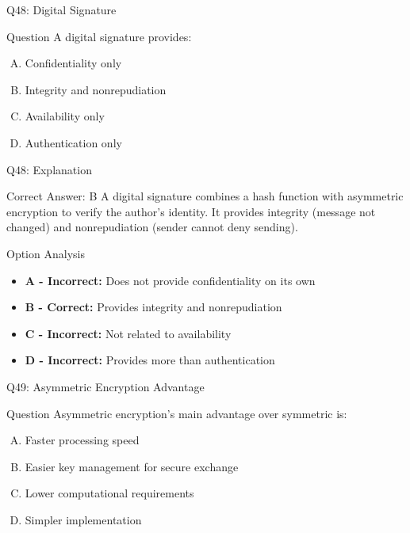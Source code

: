 \documentclass{beamer}
\begin{document}
	\begin{frame}{Q48: Digital Signature}
		\begin{block}{Question}
			A digital signature provides:
		\end{block}
		\begin{enumerate}[(A)]
			\item Confidentiality only
			\item Integrity and nonrepudiation
			\item Availability only
			\item Authentication only
		\end{enumerate}
	\end{frame}
	
	\begin{frame}{Q48: Explanation}
		\begin{block}{Correct Answer: B}
			A digital signature combines a hash function with asymmetric encryption to verify the author's identity. It provides integrity (message not changed) and nonrepudiation (sender cannot deny sending).
		\end{block}
		\begin{block}{Option Analysis}
			\begin{itemize}
				\item \textbf{A - Incorrect:} Does not provide confidentiality on its own
				\item \textbf{B - Correct:} Provides integrity and nonrepudiation
				\item \textbf{C - Incorrect:} Not related to availability
				\item \textbf{D - Incorrect:} Provides more than authentication
			\end{itemize}
		\end{block}
	\end{frame}
	
	\begin{frame}{Q49: Asymmetric Encryption Advantage}
		\begin{block}{Question}
			Asymmetric encryption's main advantage over symmetric is:
		\end{block}
		\begin{enumerate}[(A)]
			\item Faster processing speed
			\item Easier key management for secure exchange
			\item Lower computational requirements
			\item Simpler implementation
		\end{enumerate}
	\end{frame}
	
\end{document}
